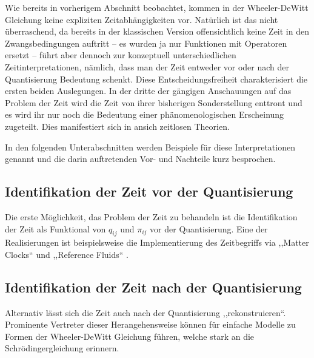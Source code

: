 \documentclass{scrartcl}
\begin{document}
		Wie bereits in vorherigem Abschnitt beobachtet, kommen in der Wheeler-DeWitt Gleichung keine
		expliziten Zeitabhängigkeiten vor. Natürlich ist das nicht überraschend, da bereits in der klassischen Version
		offensichtlich keine Zeit in den Zwangsbedingungen auftritt -- es wurden ja nur Funktionen
		mit Operatoren ersetzt -- führt aber dennoch zur konzeptuell unterschiedlichen Zeitinterpretationen, nämlich,
		dass man der Zeit entweder vor oder nach der Quantisierung Bedeutung schenkt. Diese Entscheidungsfreiheit charakterisiert
		die ersten beiden Auslegungen. In der dritte der gängigen Anschauungen auf das Problem der Zeit 
		wird die Zeit von ihrer bisherigen Sonderstellung enttront und es wird ihr nur noch die Bedeutung
		einer phänomenologischen Erscheinung zugeteilt. Dies manifestiert sich in ansich zeitlosen Theorien.
		
		In den folgenden Unterabschnitten werden Beispiele für diese Interpretationen genannt
		und die darin auftretenden Vor- und Nachteile kurz besprochen.
		\subsection{Identifikation der Zeit vor der Quantisierung} %
			Die erste Möglichkeit, das Problem der Zeit zu behandeln ist die Identifikation der
			Zeit als Funktional von $q_{ij}$ und $\pi_{ij}$ vor der Quantisierung. Eine der Realisierungen
			ist beispielsweise die Implementierung des Zeitbegriffs via ,,Matter Clocks`` und ,,Reference Fluids`` \cite{PhysRevD.43.419,gr-qc/9210011}. %
		\subsection{Identifikation der Zeit nach der Quantisierung} %
			Alternativ lässt sich die Zeit auch nach der Quantisierung ,,rekonstruieren``. Prominente 
			Vertreter dieser Herangehensweise können für einfache Modelle zu Formen der Wheeler-DeWitt Gleichung
			führen, welche stark an die Schrödingergleichung erinnern.
			
\end{document}
